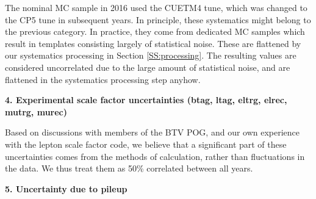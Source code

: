 The nominal \ttbar MC sample in 2016 used the CUETM4 tune, which was changed to the CP5 tune in subsequent years. In principle, these systematics might belong to the previous category. In practice, they come from dedicated MC samples which result in templates consisting largely of statistical noise. These are flattened by our systematics processing in Section \ref{SS:processing}. The resulting values are considered uncorrelated due to the large amount of statistical noise, and are flattened in the systematics processing step anyhow.

\par \noindent
\textbf{4. Experimental scale factor uncertainties (btag, ltag, eltrg, elrec, mutrg, murec)}

Based on discussions with members of the BTV POG, and our own experience with the lepton scale factor code, we believe that a significant part of these uncertainties comes from the methods of calculation, rather than fluctuations in the data. We thus treat them as 50\% correlated between all years.

\par \noindent
\textbf{5. Uncertainty due to pileup}

